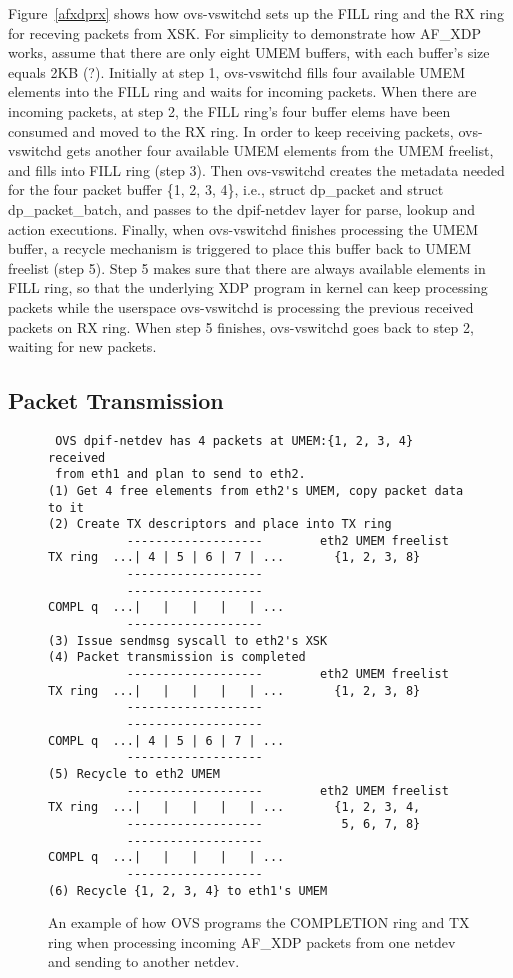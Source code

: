 \documentclass[10pt]{sigplanconf}
\begin{document}
Figure~\ref{afxdprx} shows how ovs-vswitchd sets up the FILL ring and
the RX ring for receving packets from XSK.  For simplicity to demonstrate
how AF\_XDP works, assume that there are only eight UMEM buffers, with each buffer's
size equals 2KB (?).  Initially at step 1, ovs-vswitchd fills four available UMEM elements into
the FILL ring and waits for incoming packets.  When there are incoming packets,
at step 2, the FILL ring's four buffer elems have been consumed and moved
to the RX ring.  In order to keep receiving packets, ovs-vswitchd gets another
four available UMEM elements from the UMEM freelist, and fills into FILL ring (step 3).
Then ovs-vswitchd creates the metadata needed for the four packet
buffer \{1, 2, 3, 4\}, i.e., struct dp\_packet and struct dp\_packet\_batch, and passes to 
the dpif-netdev layer for parse, lookup and action executions.
Finally, when ovs-vswitchd finishes processing the UMEM buffer, a recycle
mechanism is triggered to place this buffer back to UMEM freelist (step 5).
Step 5 makes sure that there are always available elements in FILL ring, so
that the underlying XDP program in kernel can keep processing packets 
while the userspace ovs-vswitchd is processing the previous
received packets on RX ring.
When step 5 finishes, ovs-vswitchd goes back to step 2, waiting for
new packets.

\subsection{Packet Transmission}
\begin{figure}
{\scriptsize
\begin{verbatim}
 OVS dpif-netdev has 4 packets at UMEM:{1, 2, 3, 4} received
 from eth1 and plan to send to eth2.
(1) Get 4 free elements from eth2's UMEM, copy packet data to it
(2) Create TX descriptors and place into TX ring
           -------------------        eth2 UMEM freelist
TX ring  ...| 4 | 5 | 6 | 7 | ...       {1, 2, 3, 8}
           -------------------
           -------------------
COMPL q  ...|   |   |   |   | ...
           -------------------
(3) Issue sendmsg syscall to eth2's XSK
(4) Packet transmission is completed
           -------------------        eth2 UMEM freelist
TX ring  ...|   |   |   |   | ...       {1, 2, 3, 8}
           -------------------
           -------------------
COMPL q  ...| 4 | 5 | 6 | 7 | ...
           -------------------
(5) Recycle to eth2 UMEM
           -------------------        eth2 UMEM freelist
TX ring  ...|   |   |   |   | ...       {1, 2, 3, 4,
           -------------------           5, 6, 7, 8}
           -------------------
COMPL q  ...|   |   |   |   | ...
           -------------------
(6) Recycle {1, 2, 3, 4} to eth1's UMEM 
\end{verbatim}
}
\vspace{-1.0em}
\caption{An example of how OVS programs the COMPLETION ring and TX ring when
processing incoming AF\_XDP packets from one netdev and sending to another netdev.}
\label{afxdptx}
\vspace{-1.0em}
\end{figure}
\end{document}

